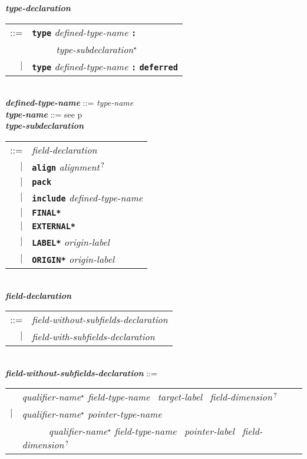 \documentclass[12pt]{article}
\newcommand{\TT}[1]{{\tt \bfseries #1}}
\newcommand{\STAR}{{\Large $^\star$}}
\newcommand{\QMARK}{{$^{\,\mbox{\footnotesize ?}}$}}
\newcommand{\ttkey}[1]{{\tt \bfseries #1}}
\newcommand{\emkey}[1]{{\em \bfseries #1}}
\newcommand{\pagref}[1]{p\pageref{#1}}
\newenvironment{indpar}[1][0.3in]%
	{\begin{list}{}%
		     {\setlength{\itemsep}{0in}%
		      \setlength{\topsep}{0in}%
		      \setlength{\parsep}{1ex}%
		      \setlength{\labelwidth}{#1}%
		      \setlength{\leftmargin}{#1}%
		      \addtolength{\leftmargin}{\labelsep}}%
	 \item}%
	{\end{list}}
\begin{document}
\begin{indpar}
\emkey{type-declaration}\label{TYPE-DECLARATION}
    \begin{tabular}[t]{rl}
    ::= & \ttkey{type} {\em defined-type-name} \TT{:} \\
	& \TT{~~~~~}{\em type-subdeclaration}\STAR{} \\
    $|$ & \ttkey{type} {\em defined-type-name} \TT{:} \ttkey{deferred} \\
    \end{tabular} \\
\emkey{defined-type-name} ::= {\em type-name} \\
\emkey{type-name} ::= see \pagref{TYPE-NAME}
\\[2ex]
\emkey{type-subdeclaration}
    \begin{tabular}[t]{@{}rl}
    ::= &  {\em field-declaration} \\
    $|$ &  \ttkey{align} {\em alignment}\QMARK{} \\
    $|$ &  \ttkey{pack} \\
    $|$ &  \ttkey{include} {\em defined-type-name} \\
    $|$ &  \ttkey{*FINAL*} \\
    $|$ &  \ttkey{*EXTERNAL*} \\
    $|$ &  \ttkey{*LABEL*} {\em origin-label} \\
    $|$ &  \ttkey{*ORIGIN*} {\em origin-label} \\
    \end{tabular}
\\[2ex]
\emkey{field-declaration}
    \begin{tabular}[t]{@{}rl}
    ::= &  {\em field-without-subfields-declaration} \\
    $|$ &  {\em field-with-subfields-declaration} \\
    \end{tabular}
\\[2ex]
\emkey{field-without-subfields-declaration} ::= \\
\hspace*{0.5in}\begin{tabular}{rl}
        & {\em qualifier-name}\STAR{} {\em field-type-name}~
          {\em target-label}~ {\em field-dimension}\QMARK{} \\
    $|$ & {\em qualifier-name}\STAR{} {\em pointer-type-name} \\
        & ~~~~~ {\em qualifier-name}\STAR{} {\em field-type-name}~
                {\em pointer-label}~ {\em field-dimension}\QMARK{}

\end{tabular}
\end{indpar}
\end{document}

